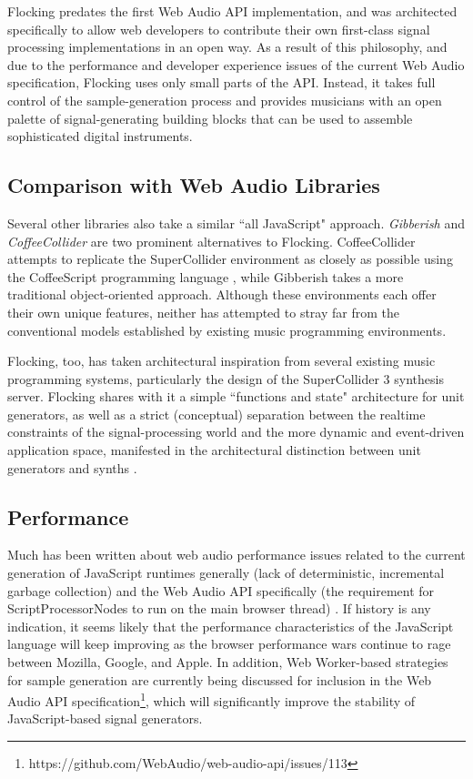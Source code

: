 \documentclass{article}
\begin{document}
Flocking predates the first Web Audio API implementation, and was architected specifically to allow web developers to contribute their own first-class signal processing implementations in an open way. As a result of this philosophy, and due to the performance and developer experience issues of the current Web Audio specification, Flocking uses only small parts of the API. Instead, it takes full control of the sample-generation process and provides musicians with an open palette of signal-generating building blocks that can be used to assemble sophisticated digital instruments.

\subsection{Comparison with Web Audio Libraries}

Several other libraries also take a similar ``all JavaScript" approach. {\it Gibberish} \cite{roberts_web_2013} and {\it CoffeeCollider} \cite{Mohayonao} are two prominent alternatives to Flocking. CoffeeCollider attempts to replicate the SuperCollider environment as closely as possible using the CoffeeScript programming language \cite{Ashkenas}, while Gibberish takes a more traditional object-oriented approach. Although these environments each offer their own unique features, neither has attempted to stray far from the conventional models established by existing music programming environments.

Flocking, too, has taken architectural inspiration from several existing music programming systems, particularly the design of the SuperCollider 3 synthesis server. Flocking shares with it a simple ``functions and state" architecture for unit generators, as well as a strict (conceptual) separation between the realtime constraints of the signal-processing world and the more dynamic and event-driven application space, manifested in the architectural distinction between unit generators and synths \cite[pp. 64]{mccartney2002rethinking}.

\subsection{Performance}

Much has been written about web audio performance issues related to the current generation of JavaScript runtimes generally (lack of deterministic, incremental garbage collection) and the Web Audio API specifically (the requirement for ScriptProcessorNodes to run on the main browser thread) \cite{DBLP:journals/comj/WyseS13,roberts_web_2013}. If history is any indication, it seems likely that the performance characteristics of the JavaScript language will keep improving as the browser performance wars continue to rage between Mozilla, Google, and Apple. In addition, Web Worker-based strategies for sample generation are currently being discussed for inclusion in the Web Audio API specification\footnote{https://github.com/WebAudio/web-audio-api/issues/113}, which will significantly improve the stability of JavaScript-based signal generators.
\end{document}
